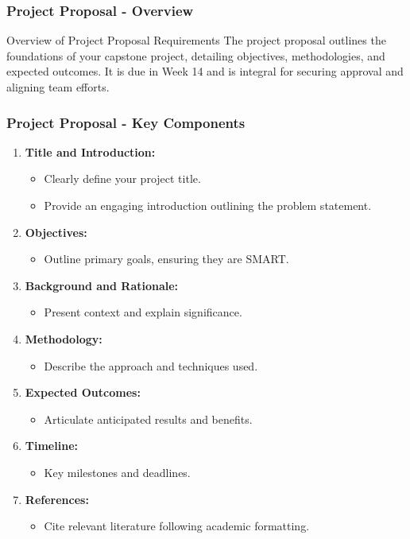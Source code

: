 \documentclass[aspectratio=169]{beamer}
\begin{document}
\begin{frame}[fragile]
  \frametitle{Project Proposal - Overview}
  \begin{block}{Overview of Project Proposal Requirements}
    The project proposal outlines the foundations of your capstone project, detailing objectives, methodologies, and expected outcomes. It is due in Week 14 and is integral for securing approval and aligning team efforts.
  \end{block}
\end{frame}

\begin{frame}[fragile]
  \frametitle{Project Proposal - Key Components}
  \begin{enumerate}
    \item \textbf{Title and Introduction:}
      \begin{itemize}
        \item Clearly define your project title.
        \item Provide an engaging introduction outlining the problem statement.
      \end{itemize}

    \item \textbf{Objectives:}
      \begin{itemize}
        \item Outline primary goals, ensuring they are SMART.
      \end{itemize}
    
    \item \textbf{Background and Rationale:}
      \begin{itemize}
        \item Present context and explain significance.
      \end{itemize}
    
    \item \textbf{Methodology:}
      \begin{itemize}
        \item Describe the approach and techniques used.
      \end{itemize}
    
    \item \textbf{Expected Outcomes:}
      \begin{itemize}
        \item Articulate anticipated results and benefits.
      \end{itemize}
    
    \item \textbf{Timeline:}
      \begin{itemize}
        \item Key milestones and deadlines.
      \end{itemize}

    \item \textbf{References:}
      \begin{itemize}
        \item Cite relevant literature following academic formatting.
      \end{itemize}
  \end{enumerate}
\end{frame}
\end{document}
